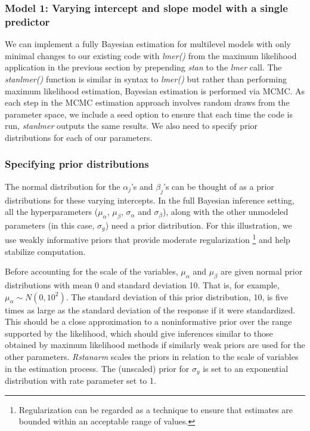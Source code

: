 \subsubsection*{Model 1: Varying intercept and slope model with a single predictor}

We can implement a fully Bayesian estimation for multilevel models with only minimal changes to our existing code with \textit{lmer()} from the maximum likelihood application in the previous section by prepending \textit{stan\textunderscore} to the \textit{lmer} call. The \textit{stan\textunderscore lmer()} function is similar in syntax to \textit{lmer()} but rather than performing maximum likelihood estimation, Bayesian estimation is performed via MCMC. As each step in the MCMC estimation approach involves random draws from the parameter space, we include a seed option to ensure that each time the code is run, \textit{stan\textunderscore lmer} outputs the same results. We also need to specify prior distributions for each of our parameters.

\subsubsection*{Specifying prior distributions}


The normal distribution for the $\alpha_{j}$'s and $\beta_{j}$'s can be thought of as a prior distributions for these varying intercepts. In the full Bayesian inference setting, all the hyperparameters ($\mu_{\alpha}$, $\mu_{\beta}$, $\sigma_{\alpha}$ and $\sigma_{\beta}$), along with the other unmodeled parameters (in this case, $\sigma_{y}$) need a prior distribution. For this illustration, we use weakly informative priors that provide moderate regularization \footnote{Regularization can be regarded as a technique to ensure that estimates are bounded within an acceptable range of values.} and help stabilize computation.

Before accounting for the scale of the variables, $\mu_{\alpha}$ and $\mu_{\beta}$ are given normal prior distributions with mean 0 and standard deviation 10.  That is, for example, $\mu_{\alpha} \sim N(0, 10^2)$. The standard deviation of this prior distribution, 10, is five times as large as the standard deviation of the response if it were standardized. This should be a close approximation to a noninformative prior over the range supported by the likelihood, which should give inferences similar to those obtained by maximum likelihood methods if similarly weak priors are used for the other parameters. \textit{Rstanarm} scales the priors in relation to the scale of variables in the estimation process. The (unscaled) prior for $\sigma_{y}$ is set to an exponential distribution with rate parameter set to 1.

